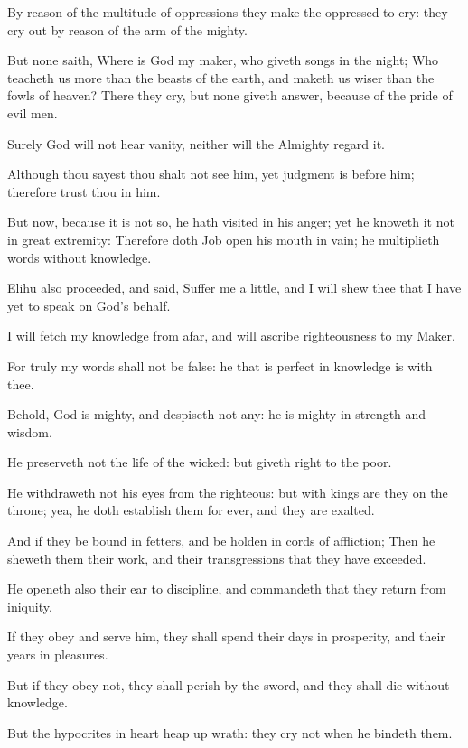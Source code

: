 \Verse By reason of the multitude of oppressions they make the oppressed to cry: they cry out by reason of the arm of the mighty.

\Verse But none saith, Where is God my maker, who giveth songs in the night; \Verse Who teacheth us more than the beasts of the earth, and maketh us wiser than the fowls of heaven?  \Verse There they cry, but none giveth answer, because of the pride of evil men.

\Verse Surely God will not hear vanity, neither will the Almighty regard it.

\Verse Although thou sayest thou shalt not see him, yet judgment is before him; therefore trust thou in him.

\Verse But now, because it is not so, he hath visited in his anger; yet he knoweth it not in great extremity: \Verse Therefore doth Job open his mouth in vain; he multiplieth words without knowledge.


\Chapter
\Verse Elihu also proceeded, and said, \Verse Suffer me a little, and I will shew thee that I have yet to speak on God's behalf.

\Verse I will fetch my knowledge from afar, and will ascribe righteousness to my Maker.

\Verse For truly my words shall not be false: he that is perfect in knowledge is with thee.

\Verse Behold, God is mighty, and despiseth not any: he is mighty in strength and wisdom.

\Verse He preserveth not the life of the wicked: but giveth right to the poor.

\Verse He withdraweth not his eyes from the righteous: but with kings are they on the throne; yea, he doth establish them for ever, and they are exalted.

\Verse And if they be bound in fetters, and be holden in cords of affliction; \Verse Then he sheweth them their work, and their transgressions that they have exceeded.

\Verse He openeth also their ear to discipline, and commandeth that they return from iniquity.

\Verse If they obey and serve him, they shall spend their days in prosperity, and their years in pleasures.

\Verse But if they obey not, they shall perish by the sword, and they shall die without knowledge.

\Verse But the hypocrites in heart heap up wrath: they cry not when he bindeth them.

